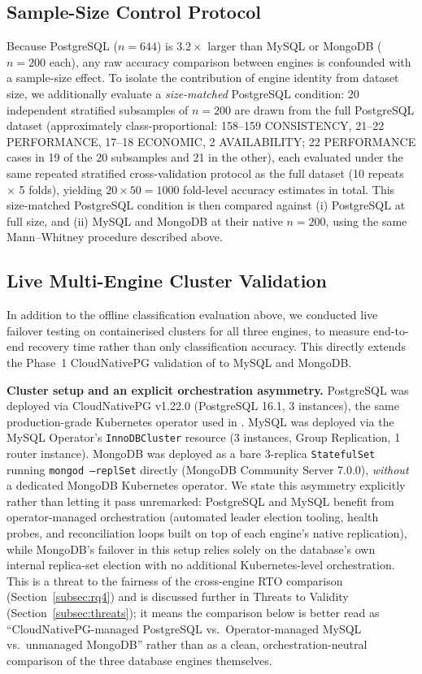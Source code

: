 \documentclass[iicol,pdflatex,sn-mathphys-num]{sn-jnl}
\theoremstyle{thmstyleone}
\theoremstyle{thmstylethree}
\begin{document}
\subsection{Sample-Size Control Protocol}\label{subsec:sizecontrol-protocol}

Because PostgreSQL ($n=644$) is $3.2\times$ larger than MySQL or
MongoDB ($n=200$ each), any raw accuracy comparison between engines is
confounded with a sample-size effect. To isolate the contribution of
engine identity from dataset size, we additionally evaluate a
\emph{size-matched} PostgreSQL condition: 20 independent stratified
subsamples of $n=200$ are drawn from the full PostgreSQL dataset
(approximately class-proportional: 158--159 CONSISTENCY, 21--22
PERFORMANCE, 17--18 ECONOMIC, 2 AVAILABILITY; 22 PERFORMANCE cases in
19 of the 20 subsamples and 21 in the other), each evaluated under the same repeated stratified
cross-validation protocol as the full dataset (10 repeats $\times$ 5
folds), yielding $20 \times 50 = 1000$ fold-level accuracy estimates
in total. This size-matched PostgreSQL condition is then
compared against (i) PostgreSQL at full size, and (ii) MySQL and
MongoDB at their native $n=200$, using the same Mann--Whitney
procedure described above.

\subsection{Live Multi-Engine Cluster Validation}\label{subsec:live-validation}

In addition to the offline classification evaluation above, we
conducted live failover testing on containerised clusters for all
three engines, to measure end-to-end recovery time rather than only
classification accuracy. This directly extends the Phase~1
CloudNativePG validation of \cite{iaha2026} to MySQL and MongoDB.

\textbf{Cluster setup and an explicit orchestration asymmetry.}
PostgreSQL was deployed via CloudNativePG v1.22.0 (PostgreSQL 16.1,
3 instances), the same production-grade Kubernetes operator used
in \cite{iaha2026}. MySQL was deployed via the MySQL Operator's
\texttt{InnoDBCluster} resource (3 instances, Group Replication, 1
router instance). MongoDB was deployed as a bare 3-replica
\texttt{StatefulSet} running \texttt{mongod --replSet} directly
(MongoDB Community Server 7.0.0), \emph{without} a dedicated MongoDB
Kubernetes operator. We state this asymmetry explicitly rather than
letting it pass unremarked: PostgreSQL and MySQL benefit from
operator-managed orchestration (automated leader election tooling,
health probes, and reconciliation loops built on top of each engine's
native replication), while MongoDB's failover in this setup relies
solely on the database's own internal replica-set election with no
additional Kubernetes-level orchestration. This is a threat to the
fairness of the cross-engine RTO comparison (Section~\ref{subsec:rq4})
and is discussed further in Threats to Validity
(Section~\ref{subsec:threats}); it means the comparison below is
better read as ``CloudNativePG-managed PostgreSQL vs.\
Operator-managed MySQL vs.\ unmanaged MongoDB'' rather than as a
clean, orchestration-neutral comparison of the three database
engines themselves.
\end{document}
